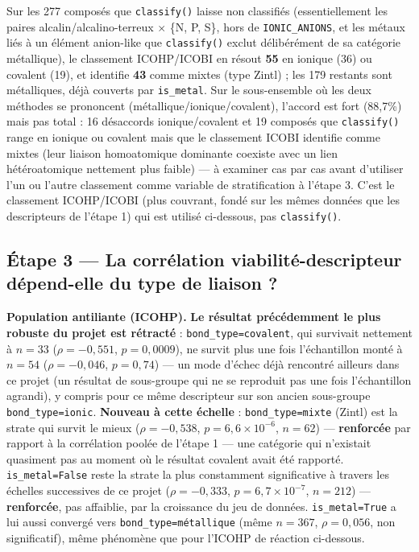 \documentclass[11pt,a4paper]{article}
\begin{document}
Sur les 277 composés que \texttt{classify()} laisse \og{}non
classifiés\fg{} (essentiellement les paires alcalin/alcalino-terreux
$\times$ \{N, P, S\}, hors de \texttt{IONIC\_ANIONS}, et les métaux
liés à un élément anion-like que \texttt{classify()} exclut
délibérément de sa catégorie \og{}métallique\fg{}), le classement
ICOHP/ICOBI en résout \textbf{55} en ionique (36) ou covalent (19), et
identifie \textbf{43} comme mixtes (type Zintl) ; les 179 restants sont
métalliques, déjà couverts par \texttt{is\_metal}. Sur le sous-ensemble
où les deux méthodes se prononcent (métallique/ionique/covalent),
l'accord est fort (88,7\%) mais pas total : 16 désaccords ionique/covalent
et 19 composés que \texttt{classify()} range en ionique ou covalent mais
que le classement ICOBI identifie comme mixtes (leur liaison
homoatomique dominante coexiste avec un lien hétéroatomique
nettement plus faible) --- à examiner cas par cas avant d'utiliser l'un
ou l'autre classement comme variable de stratification à l'étape 3.
C'est le classement ICOHP/ICOBI (plus couvrant, fondé sur les mêmes
données que les descripteurs de l'étape 1) qui est utilisé ci-dessous,
pas \texttt{classify()}.

\subsection{Étape 3 --- La corrélation viabilité-descripteur dépend-elle du type de liaison ?}
\label{sec:stratification}

\textbf{Population antiliante (ICOHP).} \textbf{Le résultat
précédemment le plus robuste du projet est rétracté} :
\texttt{bond\_type=covalent}, qui survivait nettement à $n=33$
($\rho=-0,551$, $p=0,0009$), ne survit plus une fois l'échantillon
monté à $n=54$ ($\rho=-0,046$, $p=0,74$) --- un mode d'échec déjà
rencontré ailleurs dans ce projet (un résultat de sous-groupe qui ne
se reproduit pas une fois l'échantillon agrandi), y compris pour ce
même descripteur sur son ancien sous-groupe \texttt{bond\_type=ionic}.
\textbf{Nouveau à cette échelle} :
\texttt{bond\_type=mixte} (Zintl) est la strate qui survit le
mieux ($\rho=-0,538$, $p=6,6\times10^{-6}$, $n=62$) ---
\textbf{renforcée} par rapport à la corrélation poolée de l'étape 1 ---
une catégorie qui n'existait quasiment pas au moment où le résultat
covalent avait été rapporté. \texttt{is\_metal=False} reste la strate
la plus constamment significative à travers les échelles successives de
ce projet ($\rho=-0,333$, $p=6,7\times10^{-7}$, $n=212$) ---
\textbf{renforcée}, pas affaiblie, par la croissance du jeu de données.
\texttt{is\_metal=True} a lui aussi convergé vers
\texttt{bond\_type=métallique} (même $n=367$, $\rho=0,056$, non
significatif), même phénomène que pour l'ICOHP de réaction ci-dessous.
\end{document}
